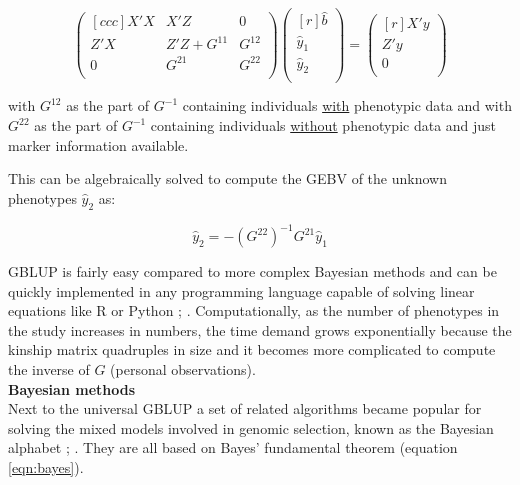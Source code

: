 \begin{equation}
 \begin{pmatrix}[ccc]
  X'X & X'Z & 0 \\ 
  Z'X & Z'Z + G^{11} & G^{12} \\ 
  0 & G^{21} & G^{22} \\ 
 \end{pmatrix}
 \begin{pmatrix}[r]
  \hat{b} \\ 
  \hat{y}_1 \\ 
  \hat{y}_2 \\ 
 \end{pmatrix}
 =
 \begin{pmatrix}[r]
  X'y \\ 
  Z'y \\ 
  0 \\ 
 \end{pmatrix}
 \label{eqn:pBLUP}
\end{equation}

with $G^{12}$ as the part of $G^{-1}$ containing individuals \underline{with} phenotypic data and with
$G^{22}$ as the part of $G^{-1}$ containing individuals \underline{without} phenotypic data and just
marker information available.

This can be algebraically solved to compute the GEBV of the unknown phenotypes $\hat{y}_2$  as:

\begin{equation}
\hat{y}_2 = -\left( G^{22}\right)^{-1}G^{21}\hat{y}_1
\label{eqn:gpred}
\end{equation}

GBLUP is fairly easy compared to more complex Bayesian methods and can be quickly implemented in any
programming language capable of solving linear equations like R or Python \cite{CRAN};
\cite{van1995python}. Computationally, as the number of phenotypes in the study increases in numbers,
the time demand grows exponentially because the kinship matrix quadruples in size and
it becomes more complicated to compute the inverse of $G$ (personal observations). \\

\noindent
\textbf{Bayesian methods} \\ 

Next to the universal GBLUP a set of related algorithms became popular for solving the mixed models
involved in genomic selection, known as the Bayesian alphabet \cite{gianola2009};
\cite{gianola2013}. They are all based on Bayes' fundamental theorem (equation \ref{eqn:bayes}).


